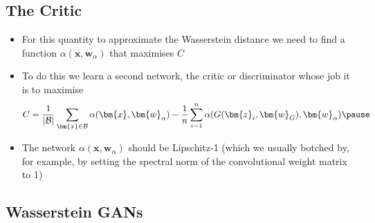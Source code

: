 
\begin{slide}
\section{The Critic}

\begin{PauseHighLight}
  \begin{itemize}
  \item For this quantity to approximate the Wasserstein distance we
    need to find a function $\alpha(\bm{x},\bm{w}_\alpha)$ that
    maximises $C$\pause
  \item To do this we learn a second network, the critic or
    discriminator whose job it is to maximise
    \begin{align*}
      C = \frac{1}{|\mathcal{B}|} \sum_{\bm{x}\in\mathcal{B}} \alpha(\bm{x},\bm{w}_\alpha) -
      \frac{1}{n} \sum_{i=1}^n \alpha(G(\bm{z}_i,\bm{w}_G),\bm{w}_\alpha)\pause
    \end{align*}
  \item The network $\alpha(\bm{x},\bm{w}_\alpha)$ should be
    Lipschitz-1 (which we usually botched by, for example, by setting
    the spectral norm of the convolutional weight matrix to 1)\pause
  \end{itemize}
\end{PauseHighLight}

\end{slide}



\begin{slide}
\section{Wasserstein GANs}

\pb\pause{}
\begin{center}
  \pause
\end{center}
\end{slide}



